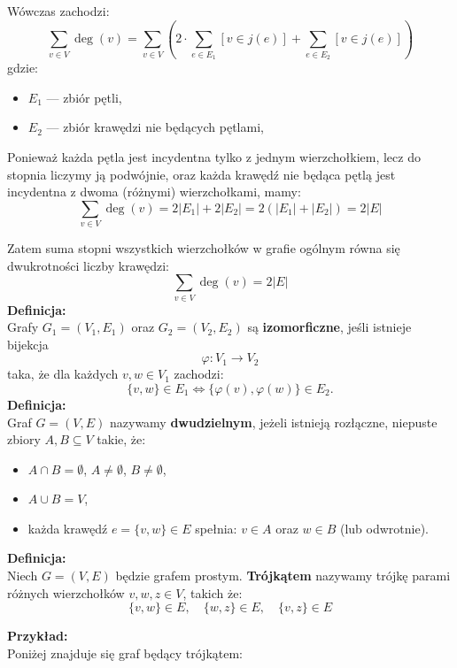 \documentclass{article}
\begin{document}
Wówczas zachodzi:
\[
\sum_{v \in V} \deg(v)
= \sum_{v \in V} \left( 2 \cdot \sum_{e \in E_1} [v \in j(e)] + \sum_{e \in E_2} [v \in j(e)] \right)
\]
gdzie:
\begin{itemize}
    \item $E_1$ --- zbiór pętli,
    \item $E_2$ --- zbiór krawędzi nie będących pętlami,
\end{itemize}

\noindent
Ponieważ każda pętla jest incydentna tylko z jednym wierzchołkiem, lecz do stopnia liczymy ją podwójnie, oraz każda krawędź nie będąca pętlą jest incydentna z dwoma (różnymi) wierzchołkami, mamy:
\[
\sum_{v \in V} \deg(v)
= 2|E_1| + 2|E_2| = 2(|E_1| + |E_2|) = 2|E|
\]

\noindent
Zatem suma stopni wszystkich wierzchołków w grafie ogólnym równa się dwukrotności liczby krawędzi:
\[
\boxed{
\sum_{v \in V} \deg(v) = 2|E|
}
\]
\textbf{Definicja:}\\
Grafy $G_{1} = (V_{1}, E_{1})$ oraz $G_{2} = (V_{2}, E_{2})$ są \textbf{izomorficzne}, jeśli istnieje bijekcja
\[
\varphi: V_{1} \to V_{2}
\]
taka, że dla każdych $v, w \in V_{1}$ zachodzi:
\[
\{v, w\} \in E_{1} \iff \{\varphi(v), \varphi(w)\} \in E_{2}.
\]
\newline
\textbf{Definicja:}\\
Graf $G = (V, E)$ nazywamy \textbf{dwudzielnym}, jeżeli istnieją rozłączne, niepuste zbiory $A, B \subseteq V$ takie, że:
\begin{itemize}
    \item $A \cap B = \emptyset$, \quad $A \neq \emptyset$, \quad $B \neq \emptyset$,
    \item $A \cup B = V$,
    \item każda krawędź $e = \{v, w\} \in E$ spełnia: $v \in A$ oraz $w \in B$ (lub odwrotnie).
\end{itemize}

\vspace{1em}

\textbf{Definicja:}\\
Niech $G = (V, E)$ będzie grafem prostym. \textbf{Trójkątem} nazywamy trójkę parami różnych wierzchołków $v, w, z \in V$, takich że:
\[
\{v, w\} \in E, \quad \{w, z\} \in E, \quad \{v, z\} \in E
\]

\vspace{1em}
\textbf{Przykład:}\\
Poniżej znajduje się graf będący trójkątem:
\end{document}
